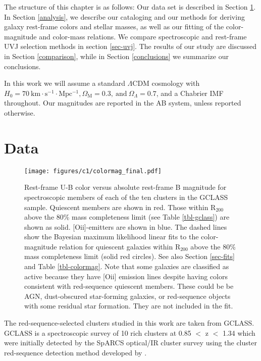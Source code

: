 The structure of this chapter is as follows:
Our data set is described in Section \ref{data}.
In Section \ref{analysis}, we describe our cataloging and our methods for deriving galaxy rest-frame colors and stellar masses, as well as our fitting of the color-magnitude and color-mass relations. We compare spectroscopic and rest-frame UVJ selection methods in section \ref{sec-uvj}.
The results of our study are discussed in Section \ref{comparison}, while in Section \ref{conclusions} we summarize our conclusions.

In this work we will assume a standard $\Lambda$CDM cosmology with $H_0 = 70 \mathrm{\ km \cdot s^{-1} \cdot Mpc^{-1}}, \Omega_\mathrm{M} = 0.3, \mathrm{\ and\ } \Omega_\Lambda = 0.7$, and a Chabrier IMF \citep{chabrierimf} throughout. Our magnitudes are reported in the AB system, unless reported otherwise.

\section{Data}\label{data}
\begin{figure*}
\centering \texttt{[image: figures/c1/colormag\_final.pdf]}
\caption[Color-magnitude diagram for the GCLASS cluster sample]{Rest-frame U-B color versus absolute rest-frame B magnitude for spectroscopic members of each of the ten clusters in the GCLASS sample.
Quiescent members are shown in red. Those within R$_{200}$ above the 80\% mass completeness limit (see Table \ref{tbl-gclass}) are shown as solid. [O{\sc ii}]-emitters are shown in blue. The dashed lines show the Bayesian maximum likelihood linear fits to the color-magnitude relation for quiescent galaxies within R$_{200}$ above the 80\% mass completeness limit (solid red circles). See also Section \ref{sec-fits} and Table \ref{tbl-colormag}.
Note that some galaxies are classified as active because they have [O{\sc ii}] emission lines despite having colors consistent with red-sequence quiescent members. These could be be AGN, dust-obscured star-forming galaxies, or red-sequence objects with some residual star formation. They are not included in the fit.\label{fig-colormag}}
\end{figure*}

The red-sequence-selected clusters studied in this work are taken from GCLASS. GCLASS is a spectroscopic survey of 10 rich clusters at 0.85 $<$ z $<$ 1.34 which were initially detected by the SpARCS optical/IR cluster survey using the cluster red-sequence detection method developed by \cite{Gladders:2000rq} \citep[see][]{Muzzin:2009jm,Wilson:2009ws,Demarco:2010om}.

